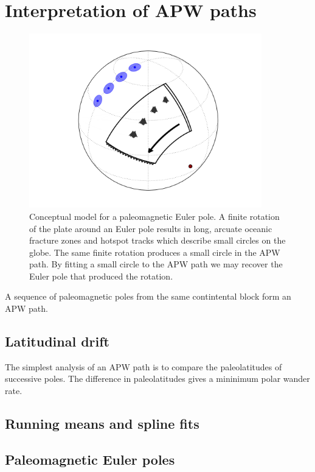 \documentclass[preprint,12pt,authoryear]{elsarticle}
\begin{document}
\section{Interpretation of APW paths}
\label{sec:apwp}
\begin{figure}
\includegraphics[width=0.9\textwidth]{figures/cartoon/paleomagnetic_euler_pole.png}
\caption[Conceptual model for a paleomagnetic Euler pole.]{Conceptual model for a paleomagnetic Euler pole. A finite rotation of the plate around an Euler pole results in long, arcuate oceanic fracture zones and hotspot tracks which describe small circles on the globe. The same finite rotation produces a small circle in the APW path. By fitting a small circle to the APW path we may recover the Euler pole that produced the rotation.}
\label{fig:pep}
\end{figure}
A sequence of paleomagnetic poles from the same contintental block form an APW path.

\subsection{Latitudinal drift}
The simplest analysis of an APW path is to compare the paleolatitudes of successive poles.
The difference in paleolatitudes gives a mininimum polar wander rate.
\subsection{Running means and spline fits}
\subsection{Paleomagnetic Euler poles}
\citet{gordon1984paleomagnetic}
\end{document}
